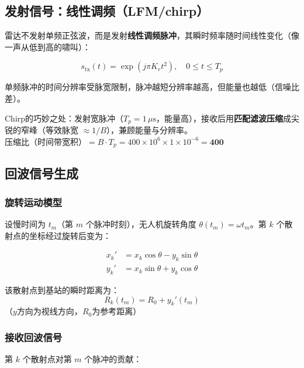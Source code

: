 \documentclass[12pt, a4paper]{article}
\begin{document}
\subsection{发射信号：线性调频（LFM/chirp）}

雷达不发射单频正弦波，而是发射\textbf{线性调频脉冲}，其瞬时频率随时间线性变化（像一声从低到高的啸叫）：

\begin{equation}
s_\text{tx}(t) = \exp\!\left(j\pi K_r t^2\right), \quad 0 \le t \le T_p
\end{equation}

\begin{intubox}[为什么用chirp而不是单频？]
单频脉冲的时间分辨率受脉宽限制，脉冲越短分辨率越高，但能量也越低（信噪比差）。

Chirp的巧妙之处：发射宽脉冲（$T_p=1\,\mu\text{s}$，能量高），接收后用\textbf{匹配滤波压缩}成尖锐的窄峰（等效脉宽 $\approx 1/B$），兼顾能量与分辨率。\\
压缩比（时间带宽积）$= B \cdot T_p = 400\times10^6 \times 1\times10^{-6} = \mathbf{400}$
\end{intubox}

\subsection{回波信号生成}

\subsubsection{旋转运动模型}

设慢时间为 $t_m$（第 $m$ 个脉冲时刻），无人机旋转角度 $\theta(t_m) = \omega t_m$。第 $k$ 个散射点的坐标经过旋转后变为：

\begin{align}
x_k' &= x_k \cos\theta - y_k \sin\theta \\
y_k' &= x_k \sin\theta + y_k \cos\theta
\end{align}

该散射点到基站的瞬时距离为：
\begin{equation}
R_k(t_m) = R_0 + y_k'(t_m)
\end{equation}
（$y$方向为视线方向，$R_0$为参考距离）

\subsubsection{接收回波信号}

第 $k$ 个散射点对第 $m$ 个脉冲的贡献：
\end{document}
